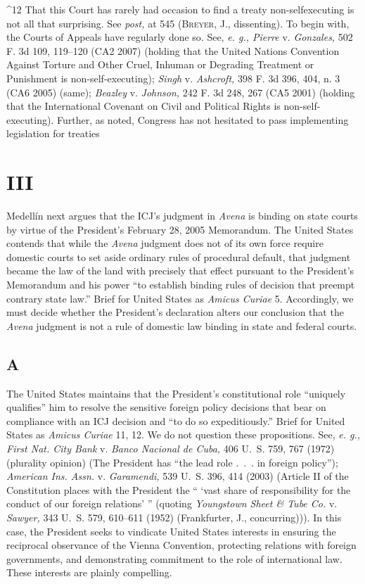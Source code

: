 {^12 That this Court has rarely had occasion to find a treaty
non-selfexecuting is not all that surprising. See \emph{post,} at 545
(\textsc{Breyer,} J., dissenting). To begin with, the Courts of Appeals
have regularly done so. See, \emph{e. g., Pierre} v. \emph{Gonzales,} 502 F.
3d 109, 119--120 (CA2 2007) (holding that the United Nations Convention
Against Torture and Other Cruel, Inhuman or Degrading Treatment or
Punishment is non-self-executing); \emph{Singh} v. \emph{Ashcroft,} 398 F.
3d 396, 404, n. 3 (CA6 2005) (same); \emph{Beazley} v. \emph{Johnson,} 242
F. 3d 248, 267 (CA5 2001) (holding that the International Covenant on
Civil and Political Rights is non-self-executing). Further, as noted,
Congress has not hesitated to pass implementing legislation for treaties

\section{III}

  Medellín next argues that the ICJ's judgment in \emph{Avena} is
binding on state courts by virtue of the President's February 28, 2005
Memorandum. The United States contends that while the \emph{Avena} judgment
does not of its own force require domestic courts to set aside ordinary
rules of procedural default, that judgment became the law of the land
with precisely that effect pursuant to the President's Memorandum
and his power ``to establish binding rules of decision that preempt
contrary state law.'' Brief for United States as \emph{Amicus Curiae} 5.
Accordingly, we must decide whether the President's declaration alters
our conclusion that the \emph{Avena} judgment is not a rule of domestic law
binding in state and federal courts.\footnotemark[13]

\subsection{A}

  The United States maintains that the President's constitutional
role ``uniquely qualifies'' him to resolve the sensitive \newpage 
foreign policy decisions that bear on compliance with an ICJ decision
and ``to do so expeditiously.'' Brief for United States as \emph{Amicus
Curiae} 11, 12. We do not question these propositions. See, \emph{e. g.,
First Nat. City Bank} v. \emph{Banco Nacional de Cuba,} 406 U.~S. 759,
767 (1972) (plurality opinion) (The President has ``the lead role
.~.~. in foreign policy''); \emph{American Ins. Assn.} v. \emph{Garamendi,}
539 U.~S. 396, 414 (2003) (Article II of the Constitution places with
the President the `` ‘vast share of responsibility for the conduct
of our foreign relations' '' (quoting \emph{Youngstown Sheet \& Tube
Co.} v. \emph{Sawyer,} 343 U.~S. 579, 610--611 (1952) (Frankfurter,
J., concurring))). In this case, the President seeks to vindicate
United States interests in ensuring the reciprocal observance of the
Vienna Convention, protecting relations with foreign governments,
and demonstrating commitment to the role of international law. These
interests are plainly compelling.

}
